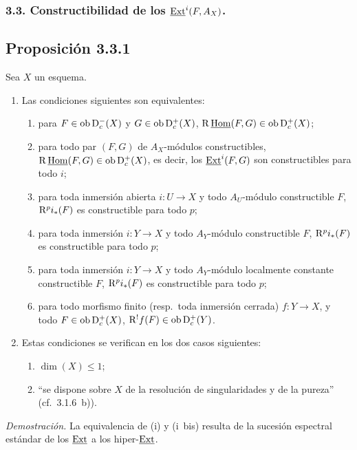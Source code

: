 \subsubsection*{3.3. Constructibilidad de los $\underline{\operatorname{Ext}}^i(F, A_X)$.}

\subsection*{Proposición 3.3.1}
Sea $X$ un esquema.
\begin{enumerate}
\item[a)] Las condiciones siguientes son equivalentes:
\begin{enumerate}
\item[(i)] para $F \in \operatorname{ob} \mathrm{D}_c^{-}(X)$ y $G \in \operatorname{ob} \mathrm{D}_c^{+}(X)$, $\mathrm{R}\,\underline{\operatorname{Hom}}(F,G) \in \operatorname{ob} \mathrm{D}_c^{+}(X)$;
\item[(i~bis)] para todo par $(F,G)$ de $A_X$-módulos constructibles, $\mathrm{R}\,\underline{\operatorname{Hom}}(F,G) \in \operatorname{ob} \mathrm{D}_c^{+}(X)$, es decir, los $\underline{\operatorname{Ext}}^i(F,G)$ son constructibles para todo $i$;
\item[(ii)] para toda inmersión abierta $i : U \to X$ y todo $A_U$-módulo constructible $F$, $\mathrm{R}^p i_{*}(F)$ es constructible para todo $p$;
\item[(ii~bis)] para toda inmersión $i : Y \to X$ y todo $A_Y$-módulo constructible $F$, $\mathrm{R}^p i_{*}(F)$ es constructible para todo $p$;
\item[(ii~ter)] para toda inmersión $i : Y \to X$ y todo $A_Y$-módulo localmente constante constructible $F$, $\mathrm{R}^p i_{*}(F)$ es constructible para todo $p$;
\item[(iii)] para todo morfismo finito (resp.~toda inmersión cerrada) $f : Y \to X$, y todo $F \in \operatorname{ob} \mathrm{D}_c^{+}(X)$, $\mathrm{R}^{!}f(F) \in \operatorname{ob} \mathrm{D}_c^{+}(Y)$.
\end{enumerate}
\item[b)] Estas condiciones se verifican en los dos casos siguientes:
\begin{enumerate}
\item[(i)] $\dim(X) \leqslant 1$;
\item[(ii)] \textquotedblleft se dispone sobre $X$ de la resolución de singularidades y de la pureza\textquotedblright{} (cf.~3.1.6~b)).
\end{enumerate}
\end{enumerate}

\emph{Demostración.} La equivalencia de (i) y (i~bis) resulta de la sucesión espectral estándar de los $\underline{\operatorname{Ext}}$ a los hiper-$\underline{\operatorname{Ext}}$.


